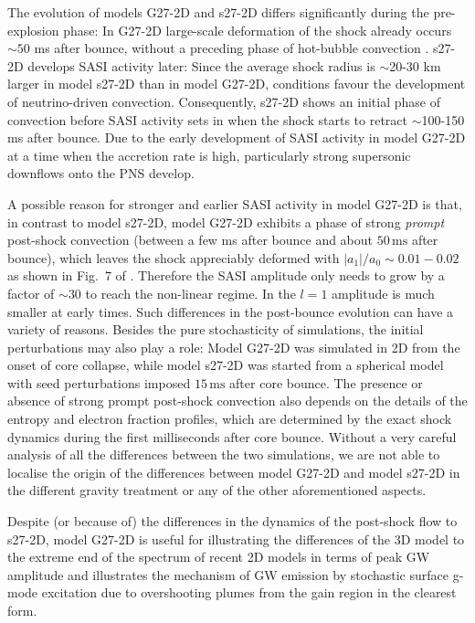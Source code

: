 {\begin{itemize}
{The evolution of models G27-2D and s27-2D differs
  significantly during the pre-explosion phase: In G27-2D large-scale
  deformation of the shock already occurs $\mathord{\sim} 50$ ms after
  bounce, without a preceding phase of hot-bubble convection
  \citep{mueller_13}.  s27-2D develops SASI activity later: Since the
  average shock radius is $\sim$20-30 km larger in model s27-2D than
  in model G27-2D, conditions favour the development of
  neutrino-driven convection. Consequently, s27-2D shows an initial
  phase of convection before SASI activity sets in when the shock
  starts to retract $\sim$100-150 ms after bounce.  Due to the early
  development of SASI activity in model G27-2D at a time when the
  accretion rate is high, particularly strong supersonic downflows
  onto the PNS develop.

A possible reason for stronger and earlier SASI activity in model
G27-2D is that, in contrast to model s27-2D, model G27-2D exhibits a
phase of strong \emph{prompt} post-shock convection (between a few ms
after bounce and about $50 \, \mathrm{ms}$ after bounce), which leaves
the shock appreciably deformed with $|a_1|/a_0 \sim 0.01-0.02$ as
shown in Fig.~7 of \citet{mueller_12b}. Therefore the SASI amplitude
only needs to grow by a factor of $\mathord{\sim} 30$ to reach the
non-linear regime. In \citet[][Fig.~2]{hanke_13} the $l = 1$ amplitude
is much smaller at early times.  Such differences in the post-bounce
evolution can have a variety of reasons. Besides the pure
stochasticity of simulations, the initial perturbations may also play
a role: Model G27-2D was simulated in 2D from the onset of core
collapse, while model s27-2D was started from a spherical model with
seed perturbations imposed $15 \, \mathrm{ms}$ after core bounce. The
presence or absence of strong prompt post-shock convection also
depends on the details of the entropy and electron fraction profiles,
which are determined by the exact shock dynamics during the first
milliseconds after core bounce. Without a very careful analysis of all
the differences between the two simulations, we are not able to
localise the origin of the differences between model G27-2D and model
s27-2D in the different gravity treatment or any of the other
aforementioned aspects.

Despite (or because of) the differences in the dynamics of the post-shock flow to
  s27-2D, model G27-2D is useful for illustrating the differences of
  the 3D model to the extreme end of the spectrum of recent 2D models
  in terms of peak GW amplitude and illustrates the mechanism of GW
  emission by stochastic surface g-mode excitation due to overshooting
  plumes from the gain region \citep{marek_08,murphy_09,mueller_13} in
  the clearest form. 
 }

\end{itemize}
}
